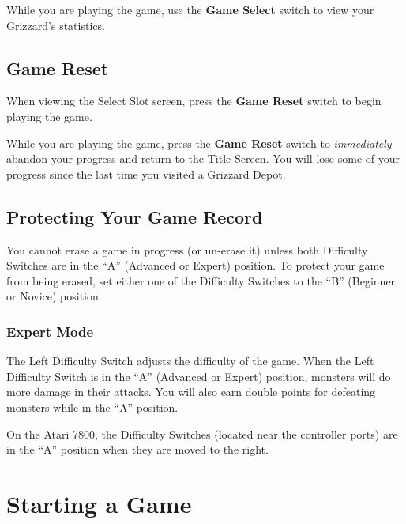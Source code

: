 \documentclass[9pt,twocolumn,openany,article]{memoir}
\begin{document}
While you  are playing the  game, use the  \textbf{Game Select}
switch to view your Grizzard's  statistics.

\subsection{Game Reset}

When  viewing the  Select  Slot screen,  press  the \textbf{Game  Reset}
switch to begin playing the game.

While you are playing the game,  press the \textbf{Game Reset} switch to
\emph{immediately} abandon your progress and return to the Title Screen.
You will  lose some  of your  progress since the  last time  you visited
a Grizzard Depot.

\ifdefined\NOSAVE\else

\subsection{Protecting Your Game Record}

You  cannot erase  a  game  in progress  (or  un-erase  it) unless  both
Difficulty  Switches are  in the  ``A'' (Advanced  or Expert)  position.
To protect your game from being erased, set either one of the Difficulty
Switches to the ``B'' (Beginner or Novice) position.

\fi

\subsubsection*{Expert Mode}

The Left Difficulty Switch adjusts the  difficulty of the game. When the
Left Difficulty  Switch is in  the ``A'' (Advanced or  Expert) position,
monsters will do more damage in their attacks. You will also earn double
points for defeating monsters while in the ``A'' position.

On the Atari 7800, the  Difficulty Switches (located near the controller
ports) are in the ``A'' position when they are moved to the right.


\section{Starting a Game}
\end{document}
